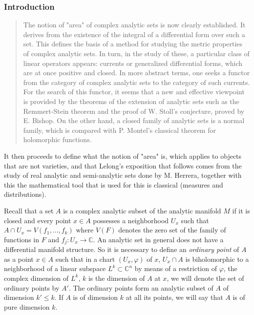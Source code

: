 \documentclass[12pt,twoside,a4paper]{report}
\begin{document}
\subsubsection{Introduction}
\label{sec:org2efdab1}
\begin{quote}
The notion of "area" of complex analytic sets is now clearly established. It derives from the existence of the integral of a differential form over such a set. This defines the basis of a method for studying the metric properties of complex analytic sets. In turn, in the study of these, a particular class of linear operators appears: currents or generalized differential forms, which are at once positive and closed. In more abstract terms, one seeks a functor from the category of complex analytic sets to the category of such currents. For the search of this functor, it seems that a new and effective viewpoint is provided by the theorems of the extension of analytic sets such as the Remmert-Stein theorem and the proof of W. Stoll's conjecture, proved by E. Bishop. On the other hand, a closed family of analytic sets is a normal family, which is compared with P. Montel's classical theorem for holomorphic functions.
\end{quote}

\noindent It then proceeds to define what the notion of "area" is, which applies to objects that are not varieties, and that Lelong's exposition that follows comes from the study of real analytic and semi-analytic sets done by M. Herrera, together with this the mathematical tool that is used for this is classical (measures and distributions).

Recall that a set $A$ is a complex analytic subset of the analytic manifold $M$ if it is closed and every point $x\in A$ possesses a neighborhood $U_x$ such that $A\cap U_x=V(f_1,\dots,f_k)$ where $V(F)$ denotes the zero set of the family of functions in $F$ and $f_j:U_x\rightarrow\mathbb{C}$. An analytic set in general does not have a differential manifold structure. So it is necessary to define an \emph{ordinary point} of $A$ as a point $x\in A$ such that in a chart $(U_x,\varphi)$ of $x$, $U_x\cap A$ is biholomorphic to a neighborhood of a linear subspace $L^{k}\subset\mathbb{C}^n$ by means of a restriction of $\varphi$, the complex dimension of $L^{k}$, $k$ is the dimension of $A$ at $x$, we will denote the set of ordinary points by $A'$. The ordinary points form an analytic subset of $A$ of dimension $k'\leq k$. If $A$ is of dimension $k$ at all its points, we will say that $A$ is of pure dimension $k$.
\end{document}
